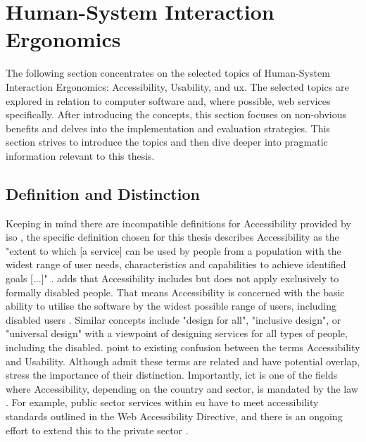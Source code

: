 \section{Human-System Interaction Ergonomics}

The following section concentrates on the selected topics of Human-System Interaction Ergonomics: Accessibility, Usability, and \gls{ux}.
The selected topics are explored in relation to computer software and, where possible, web services specifically.
After introducing the concepts, this section focuses on non-obvious benefits and delves into the implementation and evaluation strategies.
This section strives to introduce the topics and then dive deeper into pragmatic information relevant to this thesis.

\subsection{Definition and Distinction}
\label{Literature-HSIE-Definition}

Keeping in mind there are incompatible definitions for Accessibility provided by \gls{iso} \parencite{Wegge_Zimmermann_2007}, the specific definition chosen for this thesis describes Accessibility as the "extent to which [a service] can be used by people from a population with the widest range of user needs, characteristics and capabilities to achieve identified goals [...]" \parencite{ISO_9241-11:2018}.
\textcite{ISO_10779:2020} adds that Accessibility includes but does not apply exclusively to formally disabled people.
That means Accessibility is concerned with the basic ability to utilise the software by the widest possible range of users, including disabled users \parencite{Wegge_Zimmermann_2007}.
Similar concepts include "design for all", "inclusive design", or "universal design" \parencite[p. 1210]{Juergen_et_all_2020} with a viewpoint of designing services for all types of people, including the disabled.
\textcite{Wegge_Zimmermann_2007} point to existing confusion between the terms Accessibility and Usability.
Although \textcite{Wegge_Zimmermann_2007} admit these terms are related and have potential overlap, \textcite{Wegge_Zimmermann_2007} stress the importance of their distinction.
Importantly, \gls{ict} is one of the fields where Accessibility, depending on the country and sector, is mandated by the law \parencite{Wegge_Zimmermann_2007, Juergen_et_all_2020}.
For example, public sector services within \gls{eu} have to meet accessibility standards outlined in the Web Accessibility Directive, and there is an ongoing effort to extend this to the private sector \parencite{EU_Web_Accessibility}.

